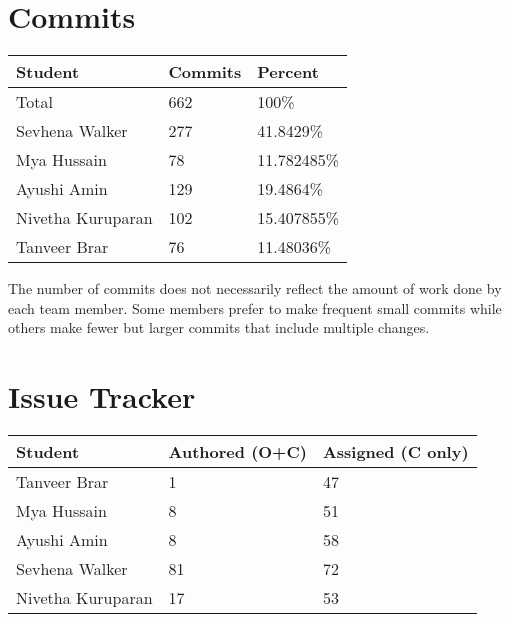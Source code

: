 \documentclass{article}
\begin{document}

\section{Commits}


\begin{table}[H]
  \centering
  \begin{tabular}{lll}
    \toprule
    \textbf{Student} & \textbf{Commits} & \textbf{Percent}\\
    \midrule
    Total & 662 & 100\% \\
    Sevhena Walker & 277 & 41.8429\% \\
    Mya Hussain & 78 & 11.782485\% \\
    Ayushi Amin & 129 & 19.4864\% \\
    Nivetha Kuruparan & 102 & 15.407855\% \\
    Tanveer Brar & 76 & 11.48036\% \\
    \bottomrule
  \end{tabular}
\end{table}

The number of commits does not necessarily reflect the amount of work
done by each team member. Some members prefer to make frequent small
commits while others make fewer but larger commits that include
multiple changes.

\section{Issue Tracker}


\begin{table}[H]
  \centering
  \begin{tabular}{lll}
    \toprule
    \textbf{Student} & \textbf{Authored (O+C)} & \textbf{Assigned (C only)}\\
    \midrule
    Tanveer Brar & 1 & 47 \\
    Mya Hussain & 8 & 51 \\
    Ayushi Amin & 8 & 58 \\
    Sevhena Walker & 81 & 72 \\
    Nivetha Kuruparan & 17 & 53 \\
    \bottomrule
  \end{tabular}
\end{table}
\end{document}
